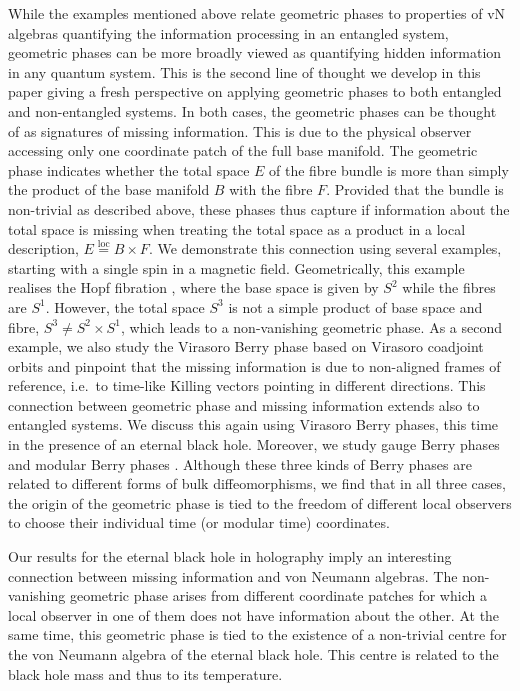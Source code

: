\documentclass[a4paper,11pt]{article}
\newcommand{\1}{\mathds{1}}
\begin{document}
While the examples mentioned above relate geometric phases to properties of vN algebras quantifying the information processing in an entangled system, geometric phases can be more broadly viewed as quantifying hidden information in any quantum system. This is the second line of thought we develop in this paper giving a fresh perspective on applying  geometric phases to both entangled and non-entangled systems. In both cases, the geometric phases can be thought of as signatures of missing information. This is due to the physical observer accessing only one coordinate patch of the full base manifold. The geometric phase indicates whether the total space $E$ of the fibre bundle is more than simply the product of the base manifold $B$ with the fibre $F$. Provided that the bundle is non-trivial as described above, these phases thus capture if information about the total space is missing when treating the total space as a product in a local description, $E\overset{\text{loc}}{=}B\times F$. We demonstrate this connection using several examples, starting with a single spin in a magnetic field. Geometrically, this example realises the Hopf fibration \cite{hopf1964abbildungen}, where the base space is given by $S^2$ while the fibres are $S^1$. However, the total space $S^3$ is not a simple product of base space and fibre, $S^3\neq S^2\times S^1$, which leads to a non-vanishing geometric phase. As a second example, we also study the Virasoro Berry phase \cite{Oblak:2017ect} based on Virasoro coadjoint orbits \cite{Compere:2015knw} and pinpoint that the missing information is due to non-aligned frames of reference, i.e.~to time-like Killing vectors pointing in different directions. This connection between geometric phase and missing information extends also to entangled systems. We discuss this again using Virasoro Berry phases,  this time in the presence of an eternal black hole. Moreover, we study gauge Berry phases \cite{Nogueira:2021ngh,Banerjee:2022jnv} and modular Berry phases \cite{Czech:2017zfq,Czech:2018kvg,Czech:2019vih,deBoer:2021zlm,Czech:2023zmq}. Although these three kinds of Berry phases are related to different forms of bulk diffeomorphisms,  we find that in all three cases, the origin of the geometric phase is tied to the freedom of different local observers to choose their individual time (or modular time) coordinates.

Our results for the eternal black hole in holography imply an interesting connection between missing information and von Neumann algebras. The non-vanishing geometric phase arises from different coordinate patches for which a local observer in one of them does not have information about the other. At the same time, this geometric phase is tied to the existence of a non-trivial centre for the von Neumann algebra of the eternal black hole. This centre is related to the black hole mass and thus to its temperature.
\end{document}
